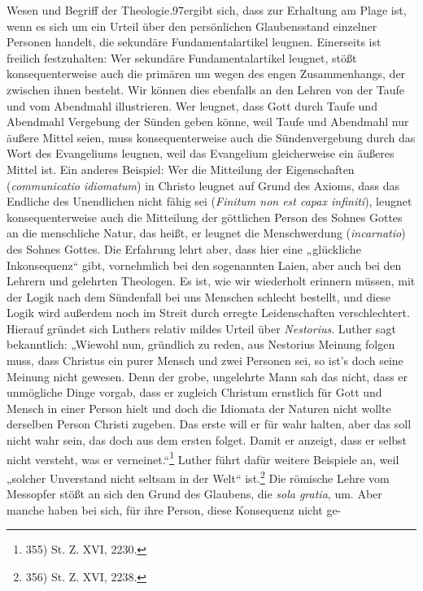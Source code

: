 Wesen und Begriff der Theologie.\hfill 97\n\nHieraus ergibt sich, dass zur Erhaltung am Plage ist, wenn es sich um ein Urteil über den persönlichen Glaubensstand einzelner Personen handelt, die sekundäre Fundamentalartikel leugnen. Einerseits ist freilich festzuhalten: Wer sekundäre Fundamentalartikel leugnet, stößt konsequenterweise auch die primären um wegen des engen Zusammenhangs, der zwischen ihnen besteht. Wir können dies ebenfalls an den Lehren von der Taufe und vom Abendmahl illustrieren. Wer leugnet, dass Gott durch Taufe und Abendmahl Vergebung der Sünden geben könne, weil Taufe und Abendmahl nur äußere Mittel seien, muss konsequenterweise auch die Sündenvergebung durch das Wort des Evangeliums leugnen, weil das Evangelium gleicherweise ein äußeres Mittel ist. Ein anderes Beispiel: Wer die Mitteilung der Eigenschaften (\textit{communicatio idiomatum}) in Christo leugnet auf Grund des Axioms, dass das Endliche des Unendlichen nicht fähig sei (\textit{Finitum non est capax infiniti}), leugnet konsequenterweise auch die Mitteilung der göttlichen Person des Sohnes Gottes an die menschliche Natur, das heißt, er leugnet die Menschwerdung (\textit{incarnatio}) des Sohnes Gottes. Die Erfahrung lehrt aber, dass hier eine „glückliche Inkonsequenz“ gibt, vornehmlich bei den sogenannten Laien, aber auch bei den Lehrern und gelehrten Theologen. Es ist, wie wir wiederholt erinnern müssen, mit der Logik nach dem Sündenfall bei uns Menschen schlecht bestellt, und diese Logik wird außerdem noch im Streit durch erregte Leidenschaften verschlechtert. Hierauf gründet sich Luthers relativ mildes Urteil über \textit{Nestorius}. Luther sagt bekanntlich: „Wiewohl nun, gründlich zu reden, aus Nestorius Meinung folgen muss, dass Christus ein purer Mensch und zwei Personen sei, so ist’s doch seine Meinung nicht gewesen. Denn der grobe, ungelehrte Mann sah das nicht, dass er unmögliche Dinge vorgab, dass er zugleich Christum ernstlich für Gott und Mensch in einer Person hielt und doch die Idiomata der Naturen nicht wollte derselben Person Christi zugeben. Das erste will er für wahr halten, aber das soll nicht wahr sein, das doch aus dem ersten folget. Damit er anzeigt, dass er selbst nicht versteht, was er verneinet.“\footnote{355) St. Z. XVI, 2230.} Luther führt dafür weitere Beispiele an, weil „solcher Unverstand nicht seltsam in der Welt“ ist.\footnote{356) St. Z. XVI, 2238.} Die römische Lehre vom Messopfer stößt an sich den Grund des Glaubens, die \textit{sola gratia}, um. Aber manche haben bei sich, für ihre Person, diese Konsequenz nicht ge-